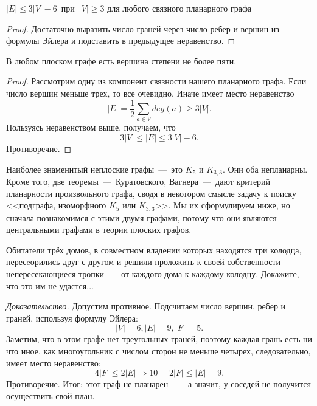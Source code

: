 \begin{consequence}
	$|E| \leqslant 3|V| - 6  \;\ \text{при}  \;\ |V| \geqslant 3$ для любого связного планарного графа
	
\begin{proof}
	Достаточно выразить число граней через число ребер и вершин из формулы Эйлера и подставить в предыдущее неравенство.
\end{proof}
\end{consequence}

\begin{consequence}
	В любом плоском графе есть вершина степени не более пяти.
	
\begin{proof}
	Рассмотрим одну из компонент связности нашего планарного графа. Если число вершин меньше трех, то все очевидно. Иначе имеет место неравенство
	$$|E| = \frac{1}{2} \sum_{a \in V} deg(a) \geqslant 3|V|.$$
	Пользуясь неравенством выше, получаем, что 
	$$3|V| \leqslant |E| \leqslant 3|V| - 6.$$
	Противоречие.
\end{proof}
\end{consequence}



	Наиболее знаменитый неплоские графы~---~это $K_5$ и $K_{3,3}$. Они оба непланарны. Кроме того, две теоремы~---~Куратовского, 
	Вагнера~---~дают критерий планарности произвольного графа, сводя в некотором смысле задачу к поиску <<подграфа, 
	изоморфного $K_5$ или $K_{3,3}$>>. Мы их сформулируем ниже, но сначала познакомимся с этими двумя графами, 
	потому что они являются центральными графами в теории плоских графов.
	
\begin{example}
	Обитатели трёх домов, в совместном владении которых находятся три колодца, пересcорились друг с другом и 
	решили проложить к своей собственности непересекающиеся тропки~---~от каждого дома к каждому колодцу. Докажите, что это им не удастся...
	
	\emph{Доказательство.} Допустим противное. Подсчитаем число вершин, ребер и граней, используя формулу Эйлера:
	$$|V| = 6, |E| = 9, |F| = 5.$$
	Заметим, что в этом графе нет треугольных граней, поэтому каждая грань есть ни что иное, как многоугольник 
	с числом сторон не меньше четырех, следовательно, имеет место неравенство:
	$$4|F| \leqslant 2|E| \Rightarrow 10 = 2|F| \leqslant |E| = 9.$$
	Противоречие. Итог: этот граф не планарен~---~ а значит, у соседей не получится осуществить свой план.
\end{example}

